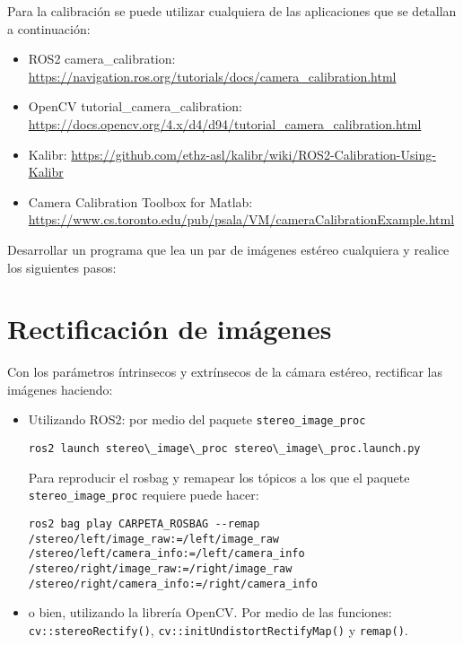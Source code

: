 \documentclass[tp]{lcc}
\begin{document}
Para la calibración se puede utilizar cualquiera de las aplicaciones que se detallan a continuación:
\begin{itemize}
	\item ROS2 camera\_calibration:  \url{https://navigation.ros.org/tutorials/docs/camera_calibration.html}
	\item OpenCV tutorial\_camera\_calibration:\\ \url{https://docs.opencv.org/4.x/d4/d94/tutorial_camera_calibration.html}
	\item Kalibr: \url{https://github.com/ethz-asl/kalibr/wiki/ROS2-Calibration-Using-Kalibr}
	\item Camera Calibration Toolbox for Matlab:\\ \url{https://www.cs.toronto.edu/pub/psala/VM/cameraCalibrationExample.html}
\end{itemize}

Desarrollar un programa que lea un par de imágenes estéreo cualquiera y realice los siguientes pasos:

\section{Rectificación de imágenes}

Con los parámetros íntrinsecos y extrínsecos de la cámara estéreo, rectificar las imágenes haciendo:

\begin{itemize}
    \item Utilizando ROS2: por medio del paquete \lstinline{stereo_image_proc}
    
\begin{lstlisting}[style=bash]     
ros2 launch stereo\_image\_proc stereo\_image\_proc.launch.py
\end{lstlisting}

Para reproducir el rosbag y remapear los tópicos a los que el paquete \lstinline{stereo_image_proc} requiere puede hacer:
\begin{lstlisting}[style=bash]   
ros2 bag play CARPETA_ROSBAG --remap /stereo/left/image_raw:=/left/image_raw /stereo/left/camera_info:=/left/camera_info /stereo/right/image_raw:=/right/image_raw /stereo/right/camera_info:=/right/camera_info
\end{lstlisting}


    \item o bien, utilizando la librería OpenCV. Por medio de las funciones: \lstinline{cv::stereoRectify()},  \lstinline{cv::initUndistortRectifyMap()} y  \lstinline{remap()}.

\end{itemize}
\end{document}
